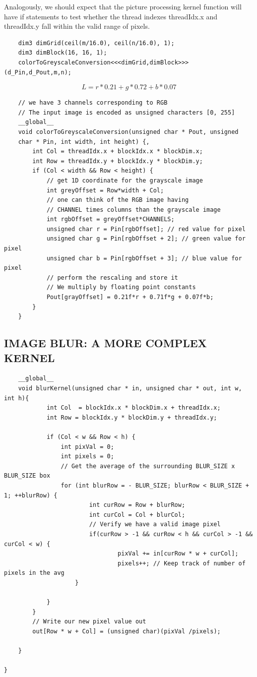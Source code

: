 \documentclass[11pt]{ctexart}
\begin{document}
Analogously, we should expect that the picture processing kernel function will have if statements to test whether the thread indexes threadIdx.x and threadIdx.y fall within the valid range of pixels.

\begin{lstlisting}
	dim3 dimGrid(ceil(m/16.0), ceil(n/16.0), 1);
	dim3 dimBlock(16, 16, 1);
	colorToGreyscaleConversion<<<dimGrid,dimBlock>>>(d_Pin,d_Pout,m,n);
\end{lstlisting}

\begin{equation}
	L = r * 0.21 + g * 0.72 + b * 0.07
\end{equation}

\begin{lstlisting}
	// we have 3 channels corresponding to RGB
	// The input image is encoded as unsigned characters [0, 255]
	__global__
	void colorToGreyscaleConversion(unsigned char * Pout, unsigned
	char * Pin, int width, int height) {,
		int Col = threadIdx.x + blockIdx.x * blockDim.x;
		int Row = threadIdx.y + blockIdx.y * blockDim.y;
		if (Col < width && Row < height) {
			// get 1D coordinate for the grayscale image
			int greyOffset = Row*width + Col;
			// one can think of the RGB image having
			// CHANNEL times columns than the grayscale image
			int rgbOffset = greyOffset*CHANNELS;
			unsigned char r = Pin[rgbOffset]; // red value for pixel
			unsigned char g = Pin[rgbOffset + 2]; // green value for pixel
			unsigned char b = Pin[rgbOffset + 3]; // blue value for pixel
			// perform the rescaling and store it
			// We multiply by floating point constants
			Pout[grayOffset] = 0.21f*r + 0.71f*g + 0.07f*b;
		}
	}
\end{lstlisting}

\subsection{IMAGE BLUR: A MORE COMPLEX KERNEL}

\begin{lstlisting}
	__global__
	void blurKernel(unsigned char * in, unsigned char * out, int w, int h){
			int Col  = blockIdx.x * blockDim.x + threadIdx.x;
			int Row = blockIdx.y * blockDim.y + threadIdx.y;
			
			if (Col < w && Row < h) {
				int pixVal = 0;
				int pixels = 0;	
				// Get the average of the surrounding BLUR_SIZE x BLUR_SIZE box
				for (int blurRow = - BLUR_SIZE; blurRow < BLUR_SIZE + 1; ++blurRow) {
						int curRow = Row + blurRow;
						int curCol = Col + blurCol;
						// Verify we have a valid image pixel
						if(curRow > -1 && curRow < h && curCol > -1 && curCol < w) {
								pixVal += in[curRow * w + curCol];
								pixels++; // Keep track of number of pixels in the avg	
					}		
			
			}
		}
		// Write our new pixel value out
		out[Row * w + Col] = (unsigned char)(pixVal /pixels); 

	}

}
\end{lstlisting}
\end{document}
